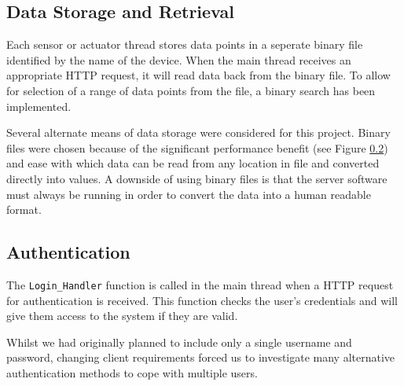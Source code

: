 \subsection{Data Storage and Retrieval}

Each sensor or actuator thread stores data points in a seperate binary file identified by the name of the device. When the main thread receives an appropriate HTTP request, it will read data back from the binary file. To allow for selection of a range of data points from the file, a binary search has been implemented.

Several alternate means of data storage were considered for this project. Binary files were chosen because of the significant performance benefit (see Figure \ref{}) and ease with which data can be read from any location in file and converted directly into values. A downside of using binary files is that the server software must always be running in order to convert the data into a human readable format.

\subsection{Authentication}

The \verb/Login_Handler/ function is called in the main thread when a HTTP request for authentication is received. This function checks the user's credentials and will give them access to the system if they are valid.


Whilst we had originally planned to include only a single username and password, changing client requirements forced us to investigate many alternative authentication methods to cope with multiple users.

